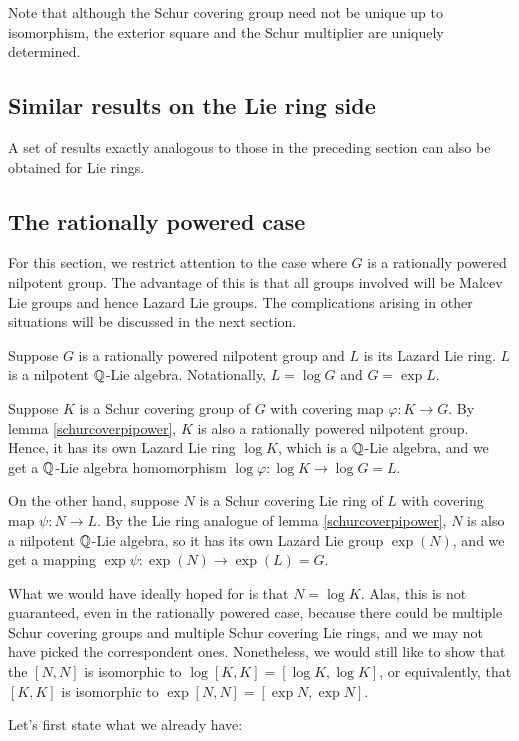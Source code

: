 \documentclass[10pt]{amsart}
\begin{document}
Note that although the Schur covering group need not be unique up to
isomorphism, the exterior square and the Schur multiplier are uniquely
determined.

\subsection{Similar results on the Lie ring side}

A set of results exactly analogous to those in the preceding section
can also be obtained for Lie rings.

\subsection{The rationally powered case}

For this section, we restrict attention to the case where $G$ is a
rationally powered nilpotent group. The advantage of this is that all
groups involved will be Malcev Lie groups and hence Lazard Lie
groups. The complications arising in other situations will be
discussed in the next section.

Suppose $G$ is a rationally powered nilpotent group and $L$ is its
Lazard Lie ring. $L$ is a nilpotent $\mathbb{Q}$-Lie algebra. Notationally, $L
= \log G$ and $G = \exp L$.

Suppose $K$ is a Schur covering group of $G$ with covering map
$\varphi:K \to G$. By lemma \ref{schurcoverpipower}, $K$ is also a
rationally powered nilpotent group. Hence, it has its own Lazard Lie
ring $\log K$, which is a $\mathbb{Q}$-Lie algebra, and we get a $\mathbb{Q}$-Lie
algebra homomorphism $\log \varphi: \log K \to \log G = L$.

On the other hand, suppose $N$ is a Schur covering Lie ring of $L$
with covering map $\psi:N \to L$. By the Lie ring analogue of lemma
\ref{schurcoverpipower}, $N$ is also a nilpotent $\mathbb{Q}$-Lie algebra, so
it has its own Lazard Lie group $\exp(N)$, and we get a mapping $\exp
\psi: \exp(N) \to \exp(L) = G$.

What we would have ideally hoped for is that $N = \log K$. Alas, this
is not guaranteed, even in the rationally powered case, because there
could be multiple Schur covering groups and multiple Schur covering
Lie rings, and we may not have picked the correspondent
ones. Nonetheless, we would still like to show that the $[N,N]$ is
isomorphic to $\log[K,K] = [\log K,\log K]$, or equivalently, that $[K,K]$ is isomorphic to $\exp[N,N] = [\exp N,\exp N]$.

Let's first state what we already have:
\end{document}
